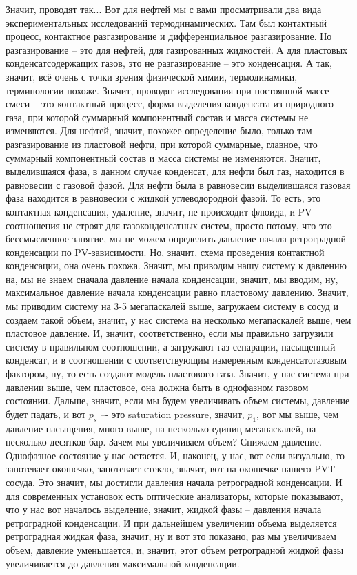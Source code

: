 \documentclass[main.tex]{subfiles}
\begin{document}
Значит, проводят так...
Вот для нефтей мы с вами просматривали два вида экспериментальных исследований термодинамических.
Там был контактный процесс, контактное разгазирование и дифференциальное разгазирование.
Но разгазирование -- это для нефтей, для газированных жидкостей.
А для пластовых конденсатсодержащих газов, это не разгазирование -- это конденсация.
А так, значит, всё очень с точки зрения физической химии, термодинамики, терминологии похоже.
Значит, проводят исследования при постоянной массе смеси -- это контактный процесс, форма выделения конденсата из природного газа, при которой суммарный компонентный состав и масса системы не изменяются.
Для нефтей, значит, похожее определение было, только там разгазирование из пластовой нефти, при которой суммарные, главное, что суммарный компонентный состав и масса системы не изменяются.
Значит, выделившаяся фаза, в данном случае конденсат, для нефти был газ, находится в равновесии с газовой фазой.
Для нефти была в равновесии выделившаяся газовая фаза находится в равновесии с жидкой углеводородной фазой.
То есть, это контактная конденсация, удаление, значит, не происходит флюида, и PV-соотношения не строят для газоконденсатных систем, просто потому, что это бессмысленное занятие, мы не можем определить давление начала ретроградной конденсации по PV-зависимости.
Но, значит, схема проведения контактной конденсации, она очень похожа.
Значит, мы приводим нашу систему к давлению на, мы не знаем сначала давление начала конденсации, значит, мы вводим, ну, максимальное давление начала конденсации равно пластовому давлению.
Значит, мы приводим систему на 3-5 мегапаскалей выше, загружаем систему в сосуд и создаем такой объем, значит, у нас система на несколько мегапаскалей выше, чем пластовое давление.
И, значит, соответственно, если мы правильно загрузили систему в правильном соотношении, а загружают газ сепарации, насыщенный конденсат, и в соотношении с соответствующим измеренным конденсатогазовым фактором, ну, то есть создают модель пластового газа.
Значит, у нас система при давлении выше, чем пластовое, она должна быть в однофазном газовом состоянии.
Дальше, значит, если мы будем увеличивать объем системы, давление будет падать, и вот $p_s$ –- это saturation pressure, значит, $p_1$, вот мы выше, чем давление насыщения, много выше, на несколько единиц мегапаскалей, на несколько десятков бар.
Зачем мы увеличиваем объем? Снижаем давление.
Однофазное состояние у нас остается.
И, наконец, у нас, вот если визуально, то запотевает окошечко, запотевает стекло, значит, вот на окошечке нашего PVT-сосуда.
Это значит, мы достигли давления начала ретроградной конденсации.
И для современных установок есть оптические анализаторы, которые показывают, что у нас вот началось выделение, значит, жидкой фазы -- давления начала ретроградной конденсации.
И при дальнейшем увеличении объема выделяется ретроградная жидкая фаза, значит, ну и вот это показано, раз мы увеличиваем объем, давление уменьшается, и, значит, этот объем ретроградной жидкой фазы увеличивается до давления максимальной конденсации.
\end{document}
